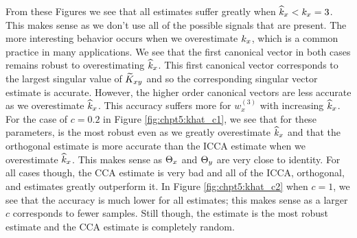 From these Figures we see that all estimates suffer greatly when $\widehat{k}_x<k_x=3$. This
makes sense as we don't use all of the possible signals that are present. The more
interesting behavior occurs when we overestimate $k_x$, which is a common practice in many
applications.  We see that the first canonical vector in both cases remains robust to
overestimating $\widehat{k}_x$. This first canonical vector corresponds to the largest singular
value of $\widetilde{K}_{xy}$ and so the corresponding singular vector estimate is accurate. However,
the higher order canonical vectors are less accurate as we overestimate $\widehat{k}_x$. This
accuracy suffers more for $w_x^{(3)}$ with increasing $\widehat{k}_x$. For the case of $c=0.2$ in
Figure \ref{fig:chpt5:khat_c1}, we see that for these parameters, \iccap is the most robust
even as we greatly overestimate $\widehat{k}_x$ and that the orthogonal estimate is more accurate
than the ICCA estimate when we overestimate $\widehat{k}_x$. This makes sense as $\Theta_x$ and $\Theta_y$
are very close to identity. For all cases though, the CCA estimate is very bad and all of
the ICCA, orthogonal, and \iccap estimates greatly outperform it. In Figure
\ref{fig:chpt5:khat_c2} when $c=1$, we see that the accuracy is much lower for all
estimates; this makes sense as a larger $c$ corresponds to fewer samples. Still though,
the \iccap estimate is the most robust estimate and the CCA estimate is completely random.

